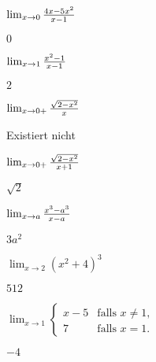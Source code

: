 \begin{exercises}
\begin{exercise} $\lim _{x\to 0 } {4x - 5x^2\over x-1}$
\begin{answer} $0$
\end{answer}\end{exercise}

\begin{exercise} $\lim _{x\to 1 } {x^2 -1 \over x-1 }$
\begin{answer} $2$
\end{answer}\end{exercise}

\begin{exercise} $\lim _{x\to 0 + } {\sqrt{2-x^2 }\over x}$
\begin{answer} Existiert nicht
\end{answer}\end{exercise}

\begin{exercise} $\lim _{x\to 0 + } {\sqrt{2-x^2}\over x+1}$
\begin{answer} $\sqrt2$
\end{answer}\end{exercise}

\begin{exercise} $\lim _{x\to a } {x^3 -a^3\over x-a}$
\begin{answer} $3a^2$
\end{answer}\end{exercise}

\begin{exercise} $\lim _{x\to 2 } (x^2 +4)^3$
\begin{answer} $512$
\end{answer}\end{exercise}

\begin{exercise} $\lim _{x\to 1 } \begin{cases}
x-5 & \text{falls $x\ne 1$}, \\
7 & \text{falls $x=1$}. \end{cases}$
\begin{answer} $-4$
\end{answer}\end{exercise}

\endtwocol

\end{exercises}



